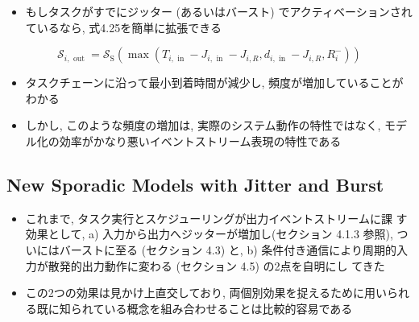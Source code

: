 \begin{frame}{}
    \begin{itemize}
        \item もしタスクがすでにジッター (あるいはバースト) でアクティベーションされているなら, 式4.25を簡単に拡張できる



    \end{itemize}
    \begin{equation*}
        \mathcal{S}_{i, \text { out }}=\mathcal{S}_{\mathrm{S}}\left(\max \left(T_{i, \text { in }}-J_{i, \text { in }}-J_{i, R}, d_{i, \text { in }}-J_{i, R}, R_{i}^{-}\right)\right)
    \end{equation*}
\end{frame}

\begin{frame}{}
    \begin{itemize}
        \item タスクチェーンに沿って最小到着時間が減少し, 頻度が増加していることがわかる
        \item しかし, このような頻度の増加は, 実際のシステム動作の特性ではなく, モデル化の効率がかなり悪いイベントストリーム表現の特性である
    \end{itemize}
\end{frame}



\subsection{New Sporadic Models with Jitter and Burst}
\label{ssec: new sporadic models with jitter and burst}

\begin{frame}{}
    \begin{itemize}
        \item これまで, タスク実行とスケジューリングが出力イベントストリームに課 す効果として, a) 入力から出力へジッターが増加し(セクション 4.1.3 参照), ついにはバーストに至る (セクション 4.3) と, b) 条件付き通信により周期的入力が散発的出力動作に変わる (セクション 4.5) の2点を自明にし てきた
        \item この2つの効果は見かけ上直交しており, 両個別効果を捉えるために用いられる既に知られている概念を組み合わせることは比較的容易である
    \end{itemize}
\end{frame}

